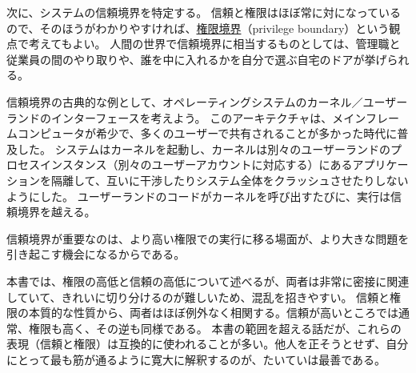 \documentclass[uplatex]{jsarticle}
\def\label#1{}%
\begin{document}
次に、システムの信頼境界を特定する。
信頼と権限はほぼ常に対になっているので、そのほうがわかりやすければ、\underline{権限境界}（privilege boundary）という観点で考えてもよい。
人間の世界で信頼境界に相当するものとしては、管理職と従業員の間のやり取りや、誰を中に入れるかを自分で選ぶ自宅のドアが挙げられる。

\begin{exa}[カーネルとユーザーランドの境界]\label{exa:ch2-kernel-userland}
信頼境界の古典的な例として、オペレーティングシステムのカーネル／ユーザーランドのインターフェースを考えよう。
このアーキテクチャは、メインフレームコンピュータが希少で、多くのユーザーで共有されることが多かった時代に普及した。
システムはカーネルを起動し、カーネルは別々のユーザーランドのプロセスインスタンス（別々のユーザーアカウントに対応する）にあるアプリケーションを隔離して、互いに干渉したりシステム全体をクラッシュさせたりしないようにした。
ユーザーランドのコードがカーネルを呼び出すたびに、実行は信頼境界を越える。
\end{exa}

信頼境界が重要なのは、より高い権限での実行に移る場面が、より大きな問題を引き起こす機会になるからである。

\begin{rem}[信頼と権限]\label{rem:ch2-trust-vs-privilege}
本書では、権限の高低と信頼の高低について述べるが、両者は非常に密接に関連していて、きれいに切り分けるのが難しいため、混乱を招きやすい。
信頼と権限の本質的な性質から、両者はほぼ例外なく相関する。信頼が高いところでは通常、権限も高く、その逆も同様である。
本書の範囲を超える話だが、これらの表現（信頼と権限）は互換的に使われることが多い。他人を正そうとせず、自分にとって最も筋が通るように寛大に解釈するのが、たいていは最善である。
\end{rem}
\end{document}

